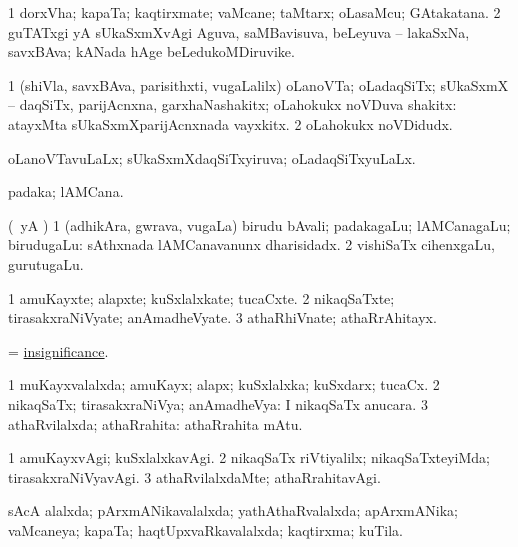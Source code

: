 \bentry
{}
\gl{\nA}
\bmng
\bnum
\num{1} dorxVha; kapaTa; kaqtirxmate; vaMcane; taMtarx; oLasaMcu; GAtakatana. 
\num{2} guTATxgi yA sUkaSxmXvAgi Aguva, saMBavisuva, beLeyuva -- lakaSxNa, savxBAva; kANada hAge beLedukoMDiruvike. 
\enum
\emng
\eentry

\bentry
{}
\gl{\nA}
\bmng
\bnum
\num{1} (shiVla, savxBAva, parisithxti, \mo vugaLalilx) oLanoVTa; oLadaqSiTx; sUkaSxmX -- daqSiTx, parijAcnxna, garxhaNashakitx; oLahokukx noVDuva shakitx:  atayxMta sUkaSxmXparijAcnxnada vayxkitx. 
\num{2} oLahokukx noVDidudx. 
\enum
\emng
\eentry

\bentry
{}
\gl{\gu}
\bmng
oLanoVTavuLaLx; sUkaSxmXdaqSiTxyiruva; oLadaqSiTxyuLaLx. 
\emng
\eentry

\bentry
{}
\gl{\nA}
\bmng
padaka; lAMCana. 
\emng
\eentry

\bentry
{}
\gl{\nA}
\bmng
(\Eva\ yA \bava) 
\bnum
\num{1} (adhikAra, gwrava, \mo vugaLa) birudu bAvali; padakagaLu; lAMCanagaLu; birudugaLu:  sAthxnada lAMCanavanunx dharisidadx. 
\num{2} vishiSaTx cihenxgaLu, gurutugaLu. 
\enum
\emng
\eentry

\bentry
{}
\gl{\nA}
\bmng
\bnum
\num{1} amuKayxte; alapxte; kuSxlalxkate; tucaCxte. 
\num{2} nikaqSaTxte; tirasakxraNiVyate; anAmadheVyate. 
\num{3} athaRhiVnate; athaRrAhitayx. 
\enum
\emng
\eentry

\bentry
{}
\gl{\nA}
\bmng
= \hyperlink{insignificance}{insignificance}. 
\emng
\eentry

\bentry
{}
\gl{\gu}
\bmng
\bnum
\num{1} muKayxvalalxda; amuKayx; alapx; kuSxlalxka; kuSxdarx; tucaCx. 
\num{2} nikaqSaTx; tirasakxraNiVya; anAmadheVya:  I nikaqSaTx anucara. 
\num{3} athaRvilalxda; athaRrahita:  athaRrahita mAtu. 
\enum
\emng
\eentry

\bentry
{}
\gl{\kirxvi}
\bmng
\bnum
\num{1} amuKayxvAgi; kuSxlalxkavAgi. 
\num{2} nikaqSaTx riVtiyalilx; nikaqSaTxteyiMda; tirasakxraNiVyavAgi. 
\num{3} athaRvilalxdaMte; athaRrahitavAgi. 
\enum
\emng
\eentry

\bentry
{}
\gl{\gu}
\bmng
sAcA alalxda; pArxmANikavalalxda; yathAthaRvalalxda; apArxmANika; vaMcaneya; kapaTa; haqtUpxvaRkavalalxda; kaqtirxma; kuTila. 
\emng
\eentry

